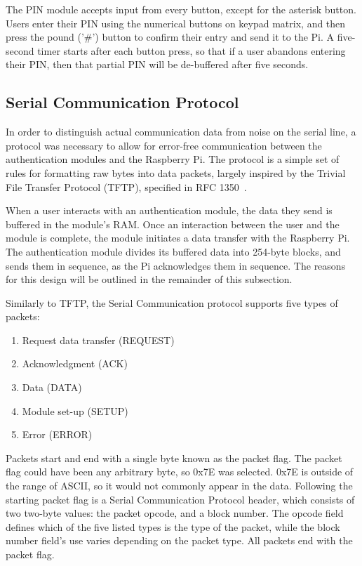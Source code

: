 \documentclass[12pt]{report}
\let\Oldsubsection\subsection
\renewcommand{\subsection}{\FloatBarrier\Oldsubsection}
\begin{document}
The PIN module accepts input from every button, except for the asterisk button. Users enter their PIN using the 
numerical buttons on keypad matrix, and then press the pound ('\#') button to confirm their entry and send it to the 
Pi. A five-second timer starts after each button press, so that if a user abandons entering their PIN, then that 
partial PIN will be de-buffered after five seconds.

\subsection{Serial Communication Protocol} \label{serial-communication-protocol}

In order to distinguish actual communication data from noise on the serial line, a protocol was necessary to allow for 
error-free communication between the authentication modules and the Raspberry Pi. The protocol is a simple set of rules 
for formatting raw bytes into data packets, largely inspired by the Trivial File Transfer Protocol (TFTP), specified in 
RFC 1350~\autocite{RFC1350}.

When a user interacts with an authentication module, the data they send is buffered in the module's RAM. Once an 
interaction between the user and the module is complete, the module initiates a data transfer with the Raspberry Pi. 
The authentication module divides its buffered data into 254-byte blocks, and sends them in sequence, as the Pi 
acknowledges them in sequence. The reasons for this design will be outlined in the remainder of this subsection.

Similarly to TFTP, the Serial Communication protocol supports five types of packets:
\begin{enumerate}
    \item Request data transfer (REQUEST)
    \item Acknowledgment (ACK)
    \item Data (DATA)
    \item Module set-up (SETUP)
    \item Error (ERROR)
\end{enumerate}
Packets start and end with a single byte known as the packet flag. The packet flag could have been any arbitrary byte, 
so 0x7E was selected. 0x7E is outside of the range of ASCII, so it would not commonly appear in the data. Following the 
starting packet flag is a Serial Communication Protocol header, which consists of two two-byte values: the packet 
opcode, and a block number. The opcode field defines which of the five listed types is the type of the packet, while 
the block number field's use varies depending on the packet type. All packets end with the packet flag.
\end{document}
